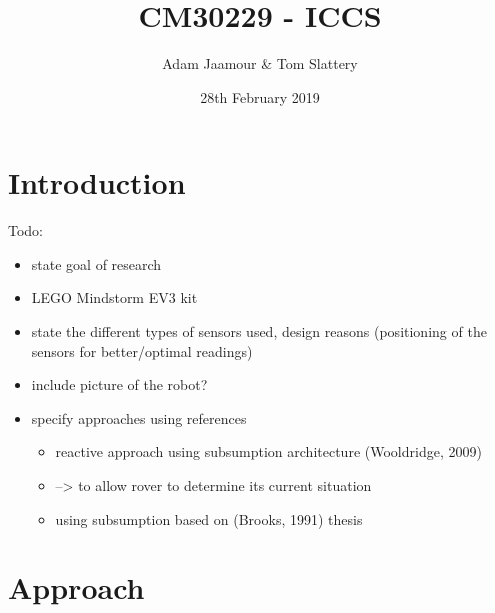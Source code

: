 \documentclass[a4paper,12pt,twocolumn]{article}
\title{CM30229 - ICCS}
\author{Adam Jaamour & Tom Slattery}
\date{28th February 2019}
\begin{document}
\maketitle
\newpage


\section{Introduction}

Todo:
\begin{itemize}
    \item state goal of research
    \item LEGO Mindstorm EV3 kit
    \item state the different types of sensors used, design reasons (positioning of the sensors for better/optimal readings)
    \item include picture of the robot?
    \item specify approaches using references
    \begin{itemize}
        \item reactive approach using subsumption architecture (Wooldridge, 2009)
        \item --> to allow rover to determine its current situation
        \item using subsumption based on (Brooks, 1991) thesis
    \end{itemize}
\end{itemize}


\section{Approach}
\end{document}
